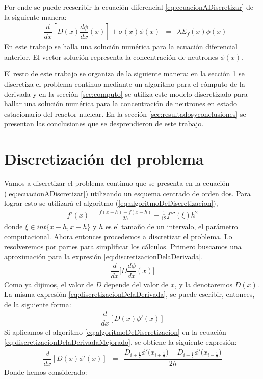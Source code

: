 \documentclass[11pt,a4paper]{emulateapj}
\begin{document}
Por ende se puede reescribir la ecuación diferencial \ref{eq:ecuacionADiscretizar} de la siguiente manera:
\begin{eqnarray}
\label{eq:ecuacionADiscretizarParticular}
  -\dfrac{d}{dx}[D(x) \dfrac{d\phi}{dx}(x)] + \sigma(x) \phi(x)  &=& \lambda  \Sigma_f(x) \phi(x)
\end{eqnarray}
En este trabajo se halla una solución numérica para la ecuación diferencial anterior. El vector solución
representa la concentración de neutrones $\phi(x)$.

El resto de este trabajo se organiza de la siguiente manera: en la sección \ref{sec:discretizacion} se discretiza
el problema continuo mediante un algoritmo para el cómputo de la derivada y en la sección \ref{sec:computo} 
se utiliza este modelo discretizado para hallar una solución numérica para la concentración de neutrones
en estado estacionario del reactor nuclear. En la sección \ref{sec:resultadosyconclusiones} se presentan las conclusiones
que se desprendieron de este trabajo.

\section{Discretización del problema}
\label{sec:discretizacion}
Vamos a discretizar el problema continuo que se presenta en la ecuación (\ref{eq:ecuacionADiscretizar}) 
utilizando un esquema centrado de orden dos. Para lograr esto se utilizará el algoritmo (\ref{eq:algoritmoDeDiscretizacion}),
\begin{eqnarray}
\label{eq:algoritmoDeDiscretizacion}
	f'(x) = \frac{f(x+h) - f(x-h)}{2h} - \frac{1}{12} f'''(\xi) h^2
\end{eqnarray}
donde $\xi \in int\{x-h,x+h\}$ y $h$ es el tamaño de un intervalo, el parámetro computacional.
Ahora entonces procedemos a discretizar el problema. Lo resolveremos por partes para simplificar los cálculos. Primero buscamos una aproximación para la expresión \ref{eq:discretizacionDelaDerivada}.
\begin{eqnarray}
\label{eq:discretizacionDelaDerivada}
	\dfrac{d}{dx}\bigg[D \dfrac{d\phi}{dx}(x)\bigg]  
\end{eqnarray}
Como ya dijimos, el valor de $D$ depende del valor de $x$, y la denotaremos $D(x)$. La misma expresión \ref{eq:discretizacionDelaDerivada}, se puede escribir, entonces, de la siguiente forma:
\begin{eqnarray}
\label{eq:discretizacionDelaDerivadaMejorado}
	\dfrac{d}{dx}[D(x) \phi'(x)]
\end{eqnarray}
Si aplicamos el algoritmo \ref{eq:algoritmoDeDiscretizacion} en la ecuación \ref{eq:discretizacionDelaDerivadaMejorado}, se obtiene la siguiente expresión:
\begin{eqnarray}
\label{eq:desarrolloDeLaDiscretizacion}
	\dfrac{d}{dx}[D(x) \phi'(x)] &=& \dfrac{D_{i+\frac{1}{2}}\phi'\big(x_{i+\frac{1}{2}}\big)  -  D_{i-\frac{1}{2}}\phi'\big(x_{i-\frac{1}{2}}\big)}     {2h} 
\end{eqnarray}
Donde hemos considerado:
\end{document}
